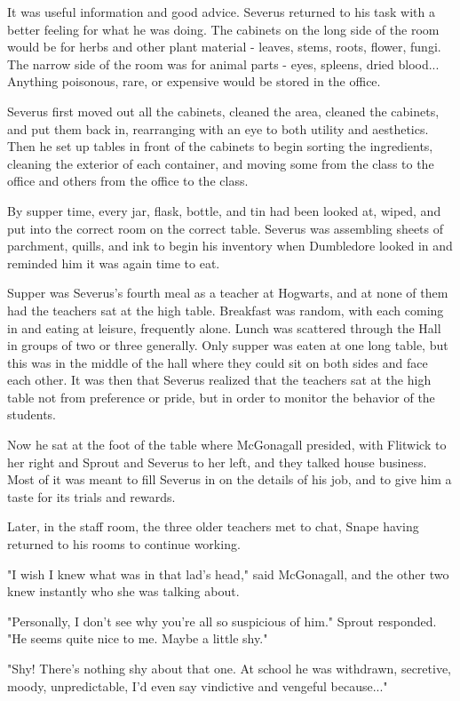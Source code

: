 It was useful information and good advice. Severus returned to his task with a better feeling for what he was doing. The cabinets on the long side of the room would be for herbs and other plant material - leaves, stems, roots, flower, fungi. The narrow side of the room was for animal parts - eyes, spleens, dried blood... Anything poisonous, rare, or expensive would be stored in the office.

Severus first moved out all the cabinets, cleaned the area, cleaned the cabinets, and put them back in, rearranging with an eye to both utility and aesthetics. Then he set up tables in front of the cabinets to begin sorting the ingredients, cleaning the exterior of each container, and moving some from the class to the office and others from the office to the class.

By supper time, every jar, flask, bottle, and tin had been looked at, wiped, and put into the correct room on the correct table. Severus was assembling sheets of parchment, quills, and ink to begin his inventory when Dumbledore looked in and reminded him it was again time to eat.

Supper was Severus's fourth meal as a teacher at Hogwarts, and at none of them had the teachers sat at the high table. Breakfast was random, with each coming in and eating at leisure, frequently alone. Lunch was scattered through the Hall in groups of two or three generally. Only supper was eaten at one long table, but this was in the middle of the hall where they could sit on both sides and face each other. It was then that Severus realized that the teachers sat at the high table not from preference or pride, but in order to monitor the behavior of the students.

Now he sat at the foot of the table where McGonagall presided, with Flitwick to her right and Sprout and Severus to her left, and they talked house business. Most of it was meant to fill Severus in on the details of his job, and to give him a taste for its trials and rewards.

Later, in the staff room, the three older teachers met to chat, Snape having returned to his rooms to continue working.

"I wish I knew what was in that lad's head," said McGonagall, and the other two knew instantly who she was talking about.

"Personally, I don't see why you're all so suspicious of him." Sprout responded. "He seems quite nice to me. Maybe a little shy."

"Shy! There's nothing shy about that one. At school he was withdrawn, secretive, moody, unpredictable, I'd even say vindictive and vengeful because..."

